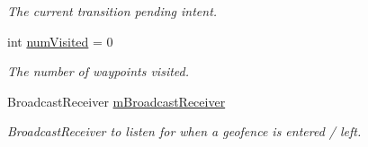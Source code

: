 \begin{DoxyCompactItemize}
\begin{DoxyCompactList}\small\item\em The current transition pending intent. \end{DoxyCompactList}\item 
int \hyperlink{classuk_1_1ac_1_1swan_1_1digitaltrails_1_1activities_1_1_map_activity_ae020582911fb809909208122f56d13e2}{num\+Visited} = 0
\begin{DoxyCompactList}\small\item\em The number of waypoints visited. \end{DoxyCompactList}\item 
Broadcast\+Receiver \hyperlink{classuk_1_1ac_1_1swan_1_1digitaltrails_1_1activities_1_1_map_activity_aaa47048b323cdbfc604d4405e9f9d33a}{m\+Broadcast\+Receiver}
\begin{DoxyCompactList}\small\item\em Broadcast\+Receiver to listen for when a geofence is entered / left. \end{DoxyCompactList}\end{DoxyCompactItemize}
